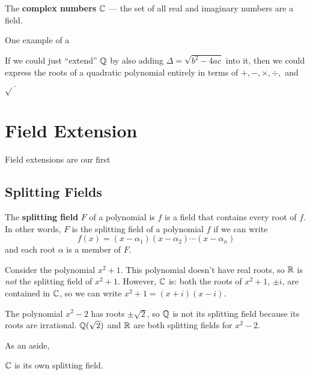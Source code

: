 \begin{example}
    The \textbf{complex numbers} $\mathbb{C}$ --- the set of all real and imaginary numbers are a field.
\end{example}



One example of a

If we could just ``extend'' $\mathbb{Q}$ by also adding $\Delta = \sqrt{b^2 - 4ac}$ into it, then we could express the roots of a quadratic polynomial entirely in terms of $+, -, \times, \div,$ and $\sqrt{}$.

\section{Field Extension}

Field extensions are our first

\subsection{Splitting Fields}

\begin{definition}
    The \textbf{splitting field} $F$ of a polynomial is $f$ is a field that contains every root of $f$. In other words, $F$ is the splitting field of a polynomial $f$ if we can write $$f(x) = (x - \alpha_1)(x - \alpha_2)\cdots(x - \alpha_n)$$ and each root $\alpha$ is a member of $F$.
\end{definition}

\begin{example}
Consider the polynomial $x^2 + 1$. This polynomial doesn't have real roots, so $\mathbb{R}$ is \textit{not} the splitting field of $x^2 + 1$. However, $\mathbb{C}$ is: both the roots of $x^2 + 1$, $\pm i$, are contained in $\mathbb{C}$, so we can write $x^2 + 1 = (x + i)(x - i)$.
\end{example}

\begin{example}
    The polynomial $x^2 - 2$ has roots $\pm \sqrt{2}$, so $\mathbb{Q}$ is not its splitting field because its roots are irrational. $\mathbb{Q}(\sqrt{2})$ and $\mathbb{R}$ are both splitting fields for $x^2 - 2$.
\end{example}

As an aside,

\begin{theorem}
    $\mathbb{C}$ is its own splitting field.
\end{theorem}

